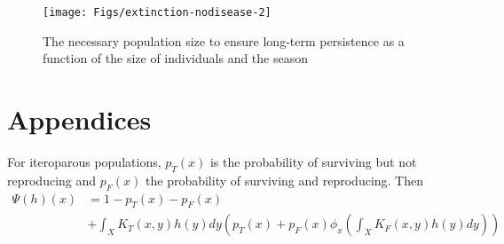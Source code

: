 \documentclass{amsart}
\begin{document}
\begin{figure}[h!!!]
\texttt{[image: Figs/extinction-nodisease-2]}
\caption{The necessary population size to ensure long-term persistence as a function of the size of individuals and the season}\label{fig:extinction-nodisease2}
\end{figure}




\section*{Appendices}

For iteroparous populations, $p_T(x)$ is the probability of surviving but not reproducing and $p_F(x)$ the probability of surviving and reproducing. Then 
\[
\begin{aligned}
\Psi(h)(x)&=1-p_T(x)-p_F(x)\\
&+\int_X K_T(x,y) h(y) dy \left(p_T(x) + p_F(x)\phi_x\left( \int_X K_F(x,y) h(y)dy\right)\right)\\
\end{aligned}
\]
\end{document}
